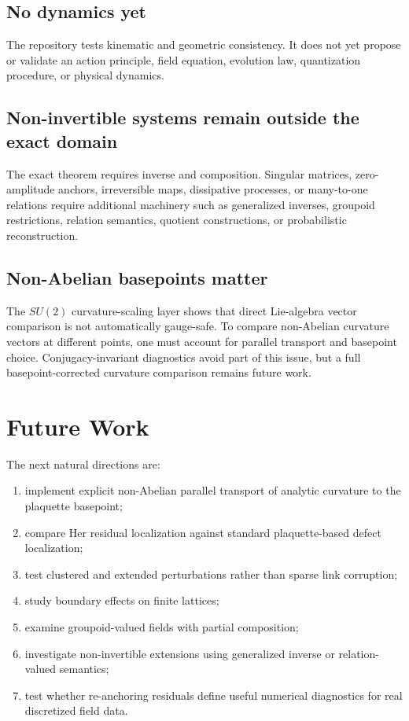 \documentclass[11pt]{article}
\newcommand{\Sutwo}{SU(2)}
\begin{document}
\subsection{No dynamics yet}
The repository tests kinematic and geometric consistency.  It does not yet propose or validate an action principle, field equation, evolution law, quantization procedure, or physical dynamics.

\subsection{Non-invertible systems remain outside the exact domain}
The exact theorem requires inverse and composition.  Singular matrices, zero-amplitude anchors, irreversible maps, dissipative processes, or many-to-one relations require additional machinery such as generalized inverses, groupoid restrictions, relation semantics, quotient constructions, or probabilistic reconstruction.

\subsection{Non-Abelian basepoints matter}
The \(\Sutwo\) curvature-scaling layer shows that direct Lie-algebra vector comparison is not automatically gauge-safe.  To compare non-Abelian curvature vectors at different points, one must account for parallel transport and basepoint choice.  Conjugacy-invariant diagnostics avoid part of this issue, but a full basepoint-corrected curvature comparison remains future work.

\section{Future Work}

The next natural directions are:
\begin{enumerate}[leftmargin=1.5em]
\item implement explicit non-Abelian parallel transport of analytic curvature to the plaquette basepoint;
\item compare Her residual localization against standard plaquette-based defect localization;
\item test clustered and extended perturbations rather than sparse link corruption;
\item study boundary effects on finite lattices;
\item examine groupoid-valued fields with partial composition;
\item investigate non-invertible extensions using generalized inverse or relation-valued semantics;
\item test whether re-anchoring residuals define useful numerical diagnostics for real discretized field data.
\end{enumerate}
\end{document}
